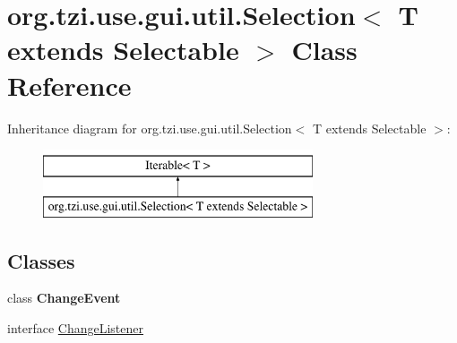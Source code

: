 \hypertarget{classorg_1_1tzi_1_1use_1_1gui_1_1util_1_1_selection_3_01_t_01extends_01_selectable_01_4}{\section{org.\-tzi.\-use.\-gui.\-util.\-Selection$<$ T extends Selectable $>$ Class Reference}
\label{classorg_1_1tzi_1_1use_1_1gui_1_1util_1_1_selection_3_01_t_01extends_01_selectable_01_4}
}
Inheritance diagram for org.\-tzi.\-use.\-gui.\-util.\-Selection$<$ T extends Selectable $>$\-:\begin{figure}[H]
\begin{center}
\leavevmode
\includegraphics[height=2.000000cm]{classorg_1_1tzi_1_1use_1_1gui_1_1util_1_1_selection_3_01_t_01extends_01_selectable_01_4}
\end{center}
\end{figure}
\subsection*{Classes}
\begin{DoxyCompactItemize}
\item 
class {\bfseries Change\-Event}
\item 
interface \hyperlink{interfaceorg_1_1tzi_1_1use_1_1gui_1_1util_1_1_selection_3_01_t_01extends_01_selectable_01_4_1_1_change_listener}{Change\-Listener}
\end{DoxyCompactItemize}
